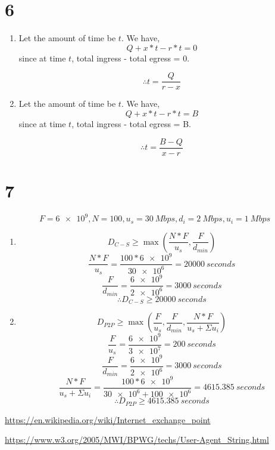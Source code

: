\documentclass[12pt,letterpaper]{article}
\begin{document}
\section*{6}
\begin{enumerate}
  \item Let the amount of time be $t$. We have,
  $$Q + x*t - r*t = 0$$
  since at time $t$, total ingress - total egress = 0.
  
  $$\therefore t = \frac{Q}{r - x}$$
  
  \item Let the amount of time be $t$. We have,
  $$Q + x*t - r*t = B$$
  since at time $t$, total ingress - total egress = B.
  
  $$\therefore t = \frac{B - Q}{x - r}$$
\end{enumerate}

\section*{7}
$$F = \num{6e9}, N = 100, u_s = \SI{30}{Mbps}, d_i = \SI{2}{Mbps}, u_i = \SI{1}{Mbps}$$
\begin{enumerate}
    \item $$D_{C-S} \geq \max(\frac{N*F}{u_s}, \frac{F}{d_{min}})$$
          $$\frac{N*F}{u_s} = \frac{100 * \num{6e9}}{\num{30e6}} = \SI{20000}{seconds}$$
          $$\frac{F}{d_{min}} = \frac{\num{6e9}}{\num{2e6}} = \SI{3000}{seconds}$$
          $$\therefore D_{C-S} \geq \SI{20000}{seconds}$$
          
    \item $$D_{P2P} \geq \max(\frac{F}{u_s}, \frac{F}{d_{min}}, \frac{N*F}{u_s + \Sigma u_i})$$
          $$\frac{F}{u_s} = \frac{\num{6e9}}{\num{3e7}} = \SI{200}{seconds}$$
          $$\frac{F}{d_{min}} = \frac{\num{6e9}}{\num{2e6}} = \SI{3000}{seconds}$$
          $$\frac{N*F}{u_s + \Sigma u_i} = \frac{100*\num{6e9}}{\num{30e6} + \num{100e6}} = \SI{4615.385}{seconds}$$
          $$\therefore D_{P2P} \geq \SI{4615.385}{seconds}$$
\end{enumerate}

\begin{thebibliography}{9}
\url{https://en.wikipedia.org/wiki/Internet_exchange_point}

\url{https://www.w3.org/2005/MWI/BPWG/techs/User-Agent_String.html}
\end{thebibliography}
\end{document}
